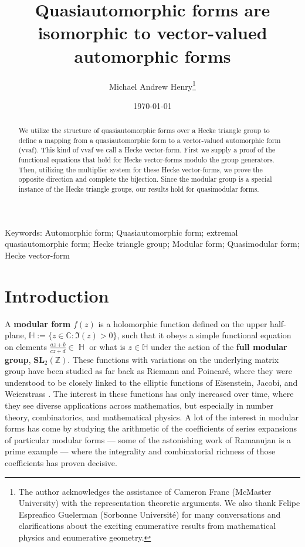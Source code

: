 \documentclass[11pt]{article}
\title{Quasiautomorphic forms are isomorphic to vector-valued automorphic forms}
\author{Michael Andrew Henry\footnote{The author acknowledges the assistance of Cameron Franc (McMaster University) with the representation theoretic arguments. We also thank Felipe Espreafico Guelerman (Sorbonne Universit\'{e}) for many conversations and clarifications about the exciting enumerative results from mathematical physics and enumerative geometry.}}
\date{\today}
\DeclareMathOperator{\HH}{\mathbb{H}}
\begin{document}
\maketitle


\begin{abstract}
    We utilize the structure of quasiautomorphic forms over a Hecke triangle group to define a mapping from a quasiautomorphic form to a vector-valued automorphic form (vvaf). This kind of vvaf we call a Hecke vector-form. First we supply a proof of the functional equations that hold for Hecke vector-forms modulo the group generators. Then, utilizing the multiplier system for these Hecke vector-forms, we prove the opposite direction and complete the bijection. Since the modular group is a special instance of the Hecke triangle groups, our results hold for quasimodular forms.  
\end{abstract}


{Keywords: Automorphic form; Quasiautomorphic form; extremal quasiautomorphic form; Hecke triangle group; Modular form; Quasimodular form; Hecke vector-form}



\section{Introduction}
A \textbf{modular form} $ f(z) $ is a holomorphic function defined on the upper half-plane, $ \mathbb{H}  := \{z\in \mathbb{C}: \Im(z)>0 \} $, such that it obeys a simple functional equation on elements $ \frac{az + b}{cz+d} \in \HH $ or what is $ z \in \mathbb{H}$ under the action of the \textbf{full modular group}, $ \mathbf{SL}_2(\mathbb{Z}) $. These functions with variations on the underlying matrix group have been studied as far back as Riemann and Poincaré, where they were understood to be closely linked to the elliptic functions of Eisenstein, Jacobi, and Weierstrass \cite{Roy2017}. The interest in these functions has only increased over time, where they see diverse applications across mathematics, but especially in number theory, combinatorics, and mathematical physics. A lot of the interest in modular forms has come by studying the arithmetic of the coefficients of series expansions of particular modular forms — some of the astonishing work of Ramanujan is a prime example — where the integrality and combinatorial richness of those coefficients has proven decisive.
\end{document}
